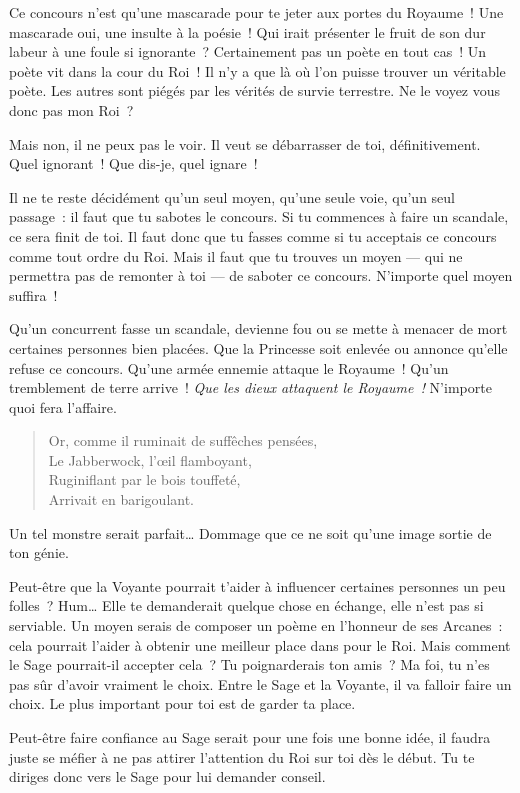{{Ce concours n’est qu’une mascarade pour te jeter aux portes du Royaume~!
Une mascarade oui, une insulte à la poésie~!
Qui irait présenter le fruit de son dur labeur à une foule si ignorante~?
Certainement pas un poète en tout cas~!
Un poète vit dans la cour du Roi~!
Il n’y a que là où l’on puisse trouver un véritable poète.
Les autres sont piégés par les vérités de survie terrestre.
Ne le voyez vous donc pas mon Roi~?

Mais non, il ne peux pas le voir.
Il veut se débarrasser de toi, définitivement.
Quel ignorant~!
Que dis-je, quel ignare~!

Il ne te reste décidément qu’un seul moyen, qu’une seule voie, qu’un seul passage~:
il faut que tu sabotes le concours.
Si tu commences à faire un scandale, ce sera finit de toi.
Il faut donc que tu fasses comme si tu acceptais ce concours comme tout ordre du Roi.
Mais il faut que tu trouves un moyen — qui ne permettra pas de remonter à toi — de saboter ce concours.
N’importe quel moyen suffira~!

Qu’un concurrent fasse un scandale, devienne fou ou se mette à menacer de mort certaines personnes bien placées.
Que la Princesse soit enlevée ou annonce qu’elle refuse ce concours.
Qu’une armée ennemie attaque le Royaume~!
Qu’un tremblement de terre arrive~!
\emph{Que les dieux attaquent le Royaume~!}
N’importe quoi fera l’affaire.

\begin{verse}
Or, comme il ruminait de suffêches pensées, \\
Le Jabberwock, l’œil flamboyant, \\
Ruginiflant par le bois touffeté, \\
Arrivait en barigoulant.
\end{verse}

Un tel monstre serait parfait…
Dommage que ce ne soit qu’une image sortie de ton génie.

Peut-être que la Voyante pourrait t’aider à influencer certaines personnes un peu folles~?  Hum…  Elle te demanderait quelque chose en échange, elle n’est pas si serviable.
Un moyen serais de composer un poème en l’honneur de ses Arcanes~:  cela pourrait l’aider à obtenir une meilleur place dans pour le Roi.
Mais comment le Sage pourrait-il accepter cela~?  Tu poignarderais ton amis~?
Ma foi, tu n’es pas sûr d’avoir vraiment le choix.
Entre le Sage et la Voyante, il va falloir faire un choix.  Le plus important pour toi est de garder ta place.

Peut-être faire confiance au Sage serait pour une fois une bonne idée, il faudra juste se méfier à ne pas attirer l’attention du Roi sur toi dès le début.
Tu te diriges donc vers le Sage pour lui demander conseil.
}

}
